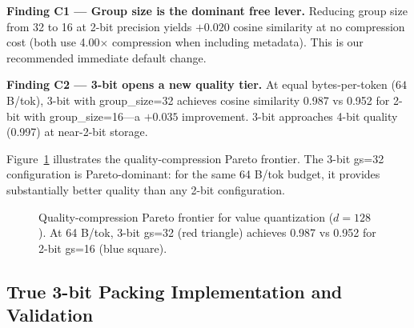 \documentclass[10pt,twocolumn]{article}
\begin{document}
\textbf{Finding C1 — Group size is the dominant free lever.} Reducing group size from 32 to 16 at 2-bit precision yields $+0.020$ cosine similarity at no compression cost (both use 4.00$\times$ compression when including metadata). This is our recommended immediate default change.

\textbf{Finding C2 — 3-bit opens a new quality tier.} At equal bytes-per-token ($64$ B/tok), 3-bit with group\_size=32 achieves cosine similarity 0.987 vs 0.952 for 2-bit with group\_size=16—a $+0.035$ improvement. 3-bit approaches 4-bit quality (0.997) at near-2-bit storage.

Figure~\ref{fig:pareto} illustrates the quality-compression Pareto frontier. The 3-bit gs=32 configuration is Pareto-dominant: for the same 64 B/tok budget, it provides substantially better quality than any 2-bit configuration.

\begin{figure}[ht]
\centering
{}
\caption{Quality-compression Pareto frontier for value quantization ($d=128$). At 64 B/tok, 3-bit gs=32 (red triangle) achieves 0.987 vs 0.952 for 2-bit gs=16 (blue square).}
\label{fig:pareto}
\end{figure}

\subsection{True 3-bit Packing Implementation and Validation}
\label{sec:3bit}
\end{document}
